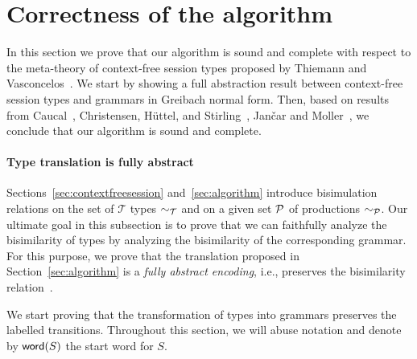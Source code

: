 \section{Correctness of the algorithm}
\label{sec:correctness}

In this section we prove that our algorithm is sound and complete
with respect to the meta-theory of context-free session types proposed
by Thiemann and Vasconcelos~\cite{thiemann2016context}.
%
We start by showing a full abstraction result between context-free
session types and grammars in Greibach normal form.
%
Then, based on results from Caucal~\cite{caucal1986decidabilite},
Christensen, H{\"{u}}ttel, and
Stirling~\cite{DBLP:journals/iandc/ChristensenHS95}, Jan{\v{c}}ar and
Moller~\cite{janvcar1999techniques}, we conclude that our algorithm is
sound and complete.

\paragraph{Type translation is fully abstract}

Sections~\ref{sec:contextfreesession} and~\ref{sec:algorithm}
introduce bisimulation relations on the set of $\mathcal T$ types
$\sim_\mathcal T$ and on a given set $\mathcal P$ of productions
$\sim_\mathcal P$.  Our ultimate goal in this subsection is to prove that
we can faithfully analyze the bisimilarity of types by analyzing the
bisimilarity of the corresponding grammar. For this purpose, we prove
that the translation proposed in Section~\ref{sec:algorithm} is a
\emph{fully abstract encoding}, i.e., preserves the bisimilarity
relation~\cite{gorla2016full}.


We start proving that the transformation of types into grammars preserves
the labelled transitions. Throughout this section, we 
will abuse notation and denote by $\mathsf{word}(S)$ the start word for $S$.

